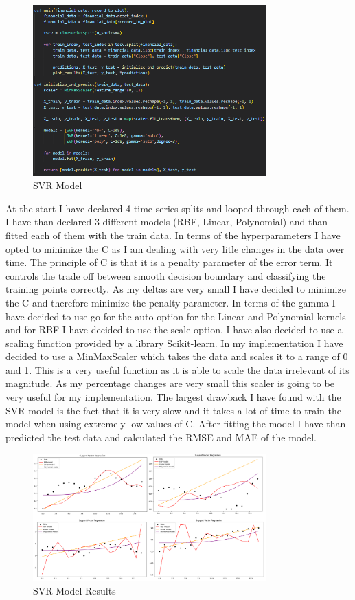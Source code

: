 \documentclass{imc-inf}
\begin{document}
			\begin{figure}[h!]
				\centering
				\includegraphics[width=0.8\textwidth]{svr_code.png}
				\caption{SVR Model}
				\label{fig:svr_model}
			\end{figure}
			At the start I have declared 4 time series splits and looped through each of them. I have than declared 3 different models (RBF, Linear, Polynomial) and than fitted each of them with the train data.
			In terms of the hyperparameters I have opted to minimize the C as I am dealing with very litle changes in the data over time. The principle of C is that it is a penalty parameter of the error term.
			It controls the trade off between smooth decision boundary and classifying the training points correctly. As my deltas are very small I have decided to minimize the C and therefore minimize the penalty parameter. 
			In terms of the gamma I have decided to use go for the auto option for the Linear and Polynomial kernels and for RBF I have decided to use the scale option. I have also decided to use a scaling function
			provided by a library Scikit-learn. In my implementation I have decided to use a MinMaxScaler which takes the data and scales it to a range of 0 and 1. This is a very useful function as it is able to scale the data 
			irrelevant of its magnitude. As my percentage changes are very small this scaler is going to be very useful for my implementation.
			The largest drawback I have found with the SVR model is the fact that it is very slow and it takes a lot of time to train the model when using extremely low values of C. 
			After fitting the model I have than predicted the test data and calculated the RMSE and MAE of the model.
			\begin{figure}[h]
				\centering
				\includegraphics[width=0.8\textwidth]{svr_chart.png}
				\caption{SVR Model Results}
				\label{fig:svr_model_plots}
			\end{figure}
\end{document}
